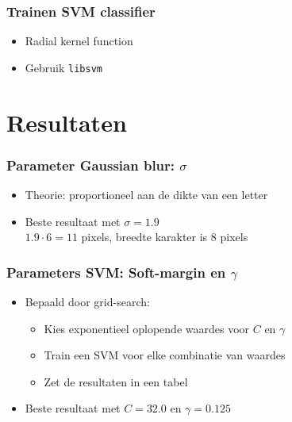 \documentclass{beamer}
\begin{document}
    \begin{frame}
        \frametitle{Trainen SVM classifier}

        \begin{itemize}
            \item Radial kernel function
            \item Gebruik \texttt{libsvm}
        \end{itemize}
    \end{frame}

    \section{Resultaten}

    \begin{frame}
        \frametitle{Parameter Gaussian blur: $\sigma$}

        \begin{itemize}
            \item Theorie: proportioneel aan de dikte van een letter
            \item Beste resultaat met $\sigma = 1.9$ \\
            $1.9 \cdot 6 = 11$ pixels, breedte karakter is 8 pixels
        \end{itemize}
    \end{frame}

    \begin{frame}
        \frametitle{Parameters SVM: Soft-margin en $\gamma$}

        \begin{itemize}
            \item Bepaald door grid-search:
            \begin{itemize}
                \item Kies exponentieel oplopende waardes voor $C$ en $\gamma$
                \item Train een SVM voor elke combinatie van waardes
                \item Zet de resultaten in een tabel
            \end{itemize}
            \item Beste resultaat met $C = 32.0$ en $\gamma = 0.125$
        \end{itemize}
    \end{frame}
\end{document}
